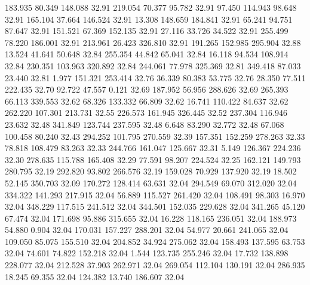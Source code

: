  183.935   80.349  148.088        32.91
 219.054   70.377   95.782        32.91
  97.450  114.943   98.648        32.91
 165.104   37.664  146.524        32.91
  13.308  148.659  184.841        32.91
  65.241   94.751   87.647        32.91
 151.521   67.369  152.135        32.91
  27.116   33.726   34.522        32.91
 255.499   78.220  186.001        32.91
 213.961   26.423  326.810        32.91
 191.265  152.985  295.904        32.88
  13.524   41.641   50.648        32.84
 255.354   44.842   65.041        32.84
  16.118   94.534  108.914        32.84
 230.351  103.963  320.892        32.84
 244.061   77.978  325.369        32.81
 349.418   87.033   23.440        32.81
   1.977  151.321  253.414        32.76
  36.339   80.383   53.775        32.76
  28.350   77.511  222.435        32.70
  92.722   47.557    0.121        32.69
 187.952   56.956  288.626        32.69
 265.393   66.113  339.553        32.62
  68.326  133.332   66.809        32.62
  16.741  110.422   84.637        32.62
 262.220  107.301  213.731        32.55
 226.573  161.945  326.445        32.52
 237.304  116.946   23.632        32.48
 341.849  123.744  237.595        32.48
   6.648   83.290   32.772        32.48
  67.068  100.458   80.240        32.43
 294.252  101.795  270.559        32.39
 157.351  152.259  278.263        32.33
  78.818  108.479   83.263        32.33
 244.766  161.047  125.667        32.31
   5.149  126.367  224.236        32.30
 278.635  115.788  165.408        32.29
  77.591   98.207  224.524        32.25
 162.121  149.793  280.795        32.19
 292.820   93.802  266.576        32.19
 159.028   70.929  137.920        32.19
  18.502   52.145  350.703        32.09
 170.272  128.414   63.631        32.04
 294.549   69.070  312.020        32.04
 334.322  141.293  217.915        32.04
  56.889  115.527  261.420        32.04
 108.491   98.303   16.970        32.04
 348.229  117.515  241.512        32.04
 344.501  152.035  229.628        32.04
 341.265   45.120   67.474        32.04
 171.698   95.886  315.655        32.04
  16.228  118.165  236.051        32.04
 188.973   54.880    0.904        32.04
 170.031  157.227  288.201        32.04
  54.977   20.661  241.065        32.04
 109.050   85.075  155.510        32.04
 204.852   34.924  275.062        32.04
 158.493  137.595   63.753        32.04
  74.601   74.822  152.218        32.04
   1.544  123.735  255.246        32.04
  17.732  138.898  228.077        32.04
 212.528   37.903  262.971        32.04
 269.054  112.104  130.191        32.04
 286.935   18.245   69.355        32.04
 124.382   13.740  186.607        32.04
